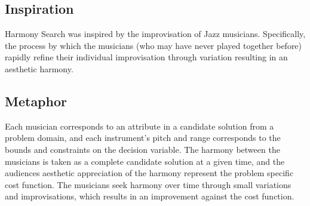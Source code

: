 \subsection{Inspiration}
Harmony Search was inspired by the improvisation of Jazz musicians. Specifically, the process by which the musicians (who may have never played together before) rapidly refine their individual improvisation through variation resulting in an aesthetic harmony.  


\subsection{Metaphor}
Each musician corresponds to an attribute in a candidate solution from a problem domain, and each instrument's pitch and range corresponds to the bounds and constraints on the decision variable. The harmony between the musicians is taken as a complete candidate solution at a given time, and the audiences aesthetic appreciation of the harmony represent the problem specific cost function. The musicians seek harmony over time through small variations and improvisations, which results in an improvement against the cost function.

